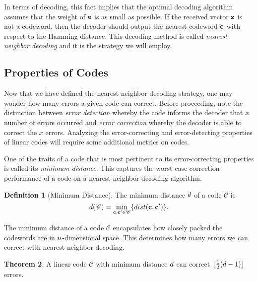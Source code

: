 \documentclass[12pt,twoside]{reedthesis}
\theoremstyle{definition}
\newtheorem{theorem}{Theorem}[chapter]
\newtheorem{definition}[theorem]{Definition}
\begin{document}
 In terms of decoding, this fact implies that the optimal decoding algorithm assumes that the weight of $\mathbf{e}$ is as small as possible. If the received vector $\mathbf{z}$ is not a codeword, then the decoder should output the nearest codeword $\mathbf{c}$ with respect to the Hamming distance. This decoding method is called \textit{nearest neighbor decoding} and it is the strategy we will employ.

\subsection{Properties of Codes}
Now that we have defined the nearest neighbor decoding strategy, one may wonder how many errors a given code can correct. Before proceeding, note the distinction between \textit{error detection} whereby the code informs the decoder that $x$ number of errors occurred and \textit{error correction} whereby the decoder is able to correct the $x$ errors. Analyzing the error-correcting and error-detecting properties of linear codes will require some additional metrics on codes.

One of the traits of a code that is most pertinent to its error-correcting properties is called its \textit{minimum distance}. This captures the worst-case correction performance of a code on a nearest neighbor decoding algorithm.

\begin{definition}[Minimum Distance] The minimum distance $d$ of a code $\mathscr{C}$ is $$d(\mathscr{C}) = \min_{\mathbf{c},\mathbf{c}' \in \mathscr{C}} \{dist(\mathbf{c},\mathbf{c}')\}.$$
\end{definition}

The minimum distance of a code $\mathscr{C}$ encapsulates how closely packed the codewords are in $n$-dimensional space. This determines how many errors we can correct with nearest-neighbor decoding.
\begin{theorem} A linear code $\mathscr{C}$ with minimum distance $d$ can correct $\lfloor \frac{1}{2} (d-1) \rfloor$ errors. 
\end{theorem}
\end{document}
